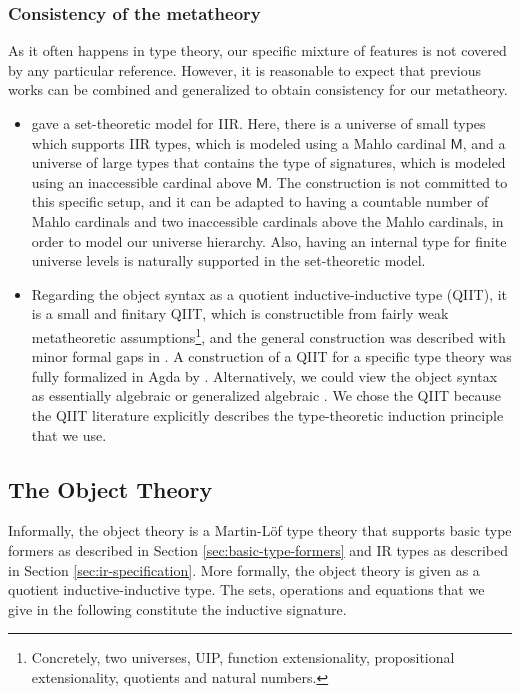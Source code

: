 \documentclass[acmsmall,screen,review,anonymous]{acmart}
\newcommand{\msf}[1]{{\mathsf{#1}}}
\begin{document}
\subsubsection{Consistency of the metatheory} As it often happens in type theory, our specific mixture
of features is not covered by any particular reference. However, it is reasonable to expect that
previous works can be combined and generalized to obtain consistency for our metatheory.
\begin{itemize}
\item \citet{DBLP:journals/jlp/DybjerS06} gave a set-theoretic model for IIR. Here, there is a
  universe of small types which supports IIR types, which is modeled using a Mahlo cardinal
  $\msf{M}$, and a universe of large types that contains the type of signatures, which is modeled
  using an inaccessible cardinal above $\msf{M}$. The construction is not committed to this specific
  setup, and it can be adapted to having a countable number of Mahlo cardinals and two inaccessible
  cardinals above the Mahlo cardinals, in order to model our universe hierarchy. Also, having an
  internal type for finite universe levels is naturally supported in the set-theoretic model.
\item Regarding the object syntax as a quotient inductive-inductive type (QIIT), it is a small and
  finitary QIIT, which is constructible from fairly weak metatheoretic
  assumptions\footnote{Concretely, two universes, UIP, function extensionality, propositional
  extensionality, quotients and natural numbers.}, and the general construction was described with
  minor formal gaps in \cite{DBLP:journals/corr/abs-2302-08837}. A construction of a QIIT for a
  specific type theory was fully formalized in Agda by \citet{initiality-agda}. Alternatively, we
  could view the object syntax as essentially algebraic \cite{partialhorn} or generalized algebraic
  \cite{cartmellthesis}. We chose the QIIT because the QIIT literature explicitly describes the
  type-theoretic induction principle that we use.
\end{itemize}

\subsection{The Object Theory}\label{sec:object-theory}

Informally, the object theory is a Martin-Löf type theory that supports basic type formers as
described in Section \ref{sec:basic-type-formers} and IR types as described in Section
\ref{sec:ir-specification}. More formally, the object theory is given as a quotient
inductive-inductive type. The sets, operations and equations that we give in the following
constitute the inductive signature.
\end{document}
